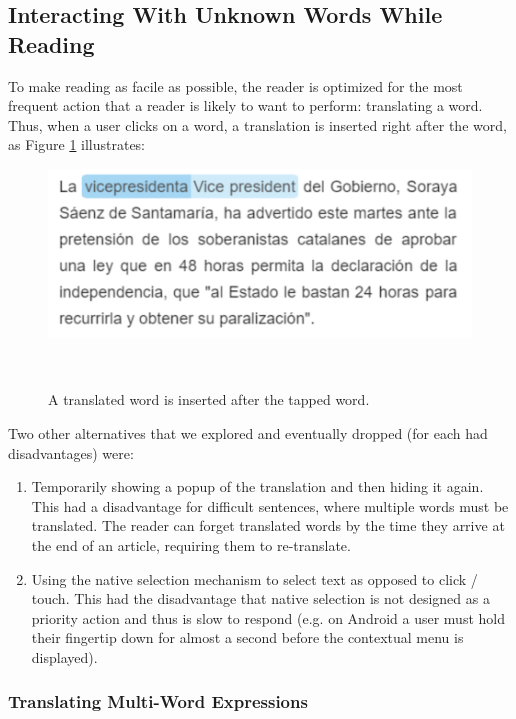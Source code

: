 \subsection{Interacting With Unknown Words While Reading}

To make reading as facile as possible, the reader is optimized for the most frequent action that a reader is likely to want to perform: translating a word. Thus, when a user clicks on a word, a translation is inserted right after the word, as Figure \ref{fig:translated_word} illustrates: 

\begin{figure}[h!]
\centering
  \includegraphics[width=0.7\columnwidth]{figures/translated_word}
  \caption{A translated word is inserted after the tapped word.}~\label{fig:translated_word}
\end{figure}

Two other alternatives that we explored and eventually dropped (for each had disadvantages) were: 

\begin{enumerate}

  \item Temporarily showing a popup of the translation and then hiding it again. This had a disadvantage for difficult sentences, where multiple words must be translated. The reader can forget translated words by the time they arrive at the end of an article, requiring them to re-translate.
  \item Using the native selection mechanism to select text as opposed to click / touch. 
  This had the disadvantage that native selection is not designed as a priority action and thus is slow to respond (e.g. on Android a user must hold their fingertip down for almost a second before the contextual menu is displayed). 
\end{enumerate}


\subsubsection{Translating Multi-Word Expressions}

